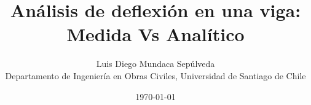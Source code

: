 \documentclass[10pt,letterpaper]{article}
\title{Análisis de deflexión en una viga: Medida Vs Analítico}
\author{Luis Diego Mundaca Sepúlveda\\
	   {\footnotesize Departamento de Ingenier\'{i}a en Obras Civiles, Universidad de Santiago de Chile}
}
\date{\today}
\begin{document}
\maketitle



\renewcommand*{\bibfont}{\footnotesize}
\printbibliography%
\end{document}

